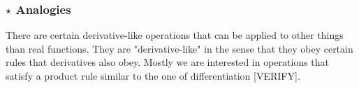 










\subsubsection{$\star$ Analogies}
There are certain derivative-like operations that can be applied to other things than real functions. They are "derivative-like" in the sense that they obey certain rules that derivatives also obey. Mostly we are interested in operations that satisfy a product rule similar to the one of differentiation [VERIFY].

